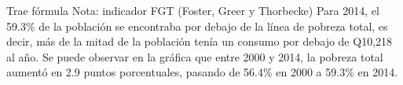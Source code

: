 Trae fórmula Nota: indicador FGT (Foster, Greer y Thorbecke) Para 2014, el 59.3\% de la población se encontraba por debajo de la línea de pobreza total, es decir, más de la mitad de la población tenía un consumo por debajo de Q10,218 al año. Se puede observar en la gráfica  que entre 2000 y 2014, la pobreza total aumentó en 2.9 puntos porcentuales, pasando de 56.4\% en 2000 a 59.3\% en 2014.